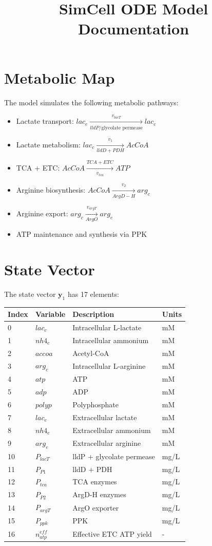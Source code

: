 \documentclass{article}
\title{SimCell ODE Model Documentation}
\author{}
\date{}
\begin{document}
\maketitle

\section{Metabolic Map}

The model simulates the following metabolic pathways:

\begin{itemize}
\item Lactate transport: $lac_e \xrightarrow[lldP/\text{glycolate permease}]{v_{lacT}} lac_c$
\item Lactate metabolism: $lac_c \xrightarrow[lldD + PDH]{v_1} AcCoA$
\item TCA + ETC: $AcCoA \xrightarrow[v_{tca}]{TCA + ETC} ATP$
\item Arginine biosynthesis: $AcCoA \xrightarrow[ArgD-H]{v_2} arg_c$
\item Arginine export: $arg_c \xrightarrow[ArgO]{v_{argT}} arg_e$
\item ATP maintenance and synthesis via PPK
\end{itemize}

\section{State Vector}

The state vector $\mathbf{y}_1$ has 17 elements:

\begin{tabular}{@{}llll@{}}
\toprule
Index & Variable & Description & Units \\
\midrule
0 & $lac_c$ & Intracellular L-lactate & mM \\
1 & $nh4_c$ & Intracellular ammonium & mM \\
2 & $accoa$ & Acetyl-CoA & mM \\
3 & $arg_c$ & Intracellular L-arginine & mM \\
4 & $atp$ & ATP & mM \\
5 & $adp$ & ADP & mM \\
6 & $polyp$ & Polyphosphate & mM \\
7 & $lac_e$ & Extracellular lactate & mM \\
8 & $nh4_e$ & Extracellular ammonium & mM \\
9 & $arg_e$ & Extracellular arginine & mM \\
10 & $P_{lacT}$ & lldP + glycolate permease & mg/L \\
11 & $P_{P1}$ & lldD + PDH & mg/L \\
12 & $P_{tca}$ & TCA enzymes & mg/L \\
13 & $P_{P2}$ & ArgD-H enzymes & mg/L \\
14 & $P_{argT}$ & ArgO exporter & mg/L \\
15 & $P_{ppk}$ & PPK & mg/L \\
16 & $n_{atp}^{eff}$ & Effective ETC ATP yield & - \\
\bottomrule
\end{tabular}
\end{document}
